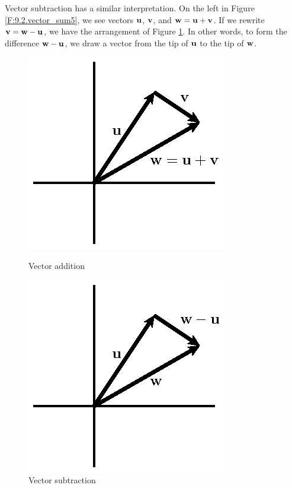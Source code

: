 Vector subtraction has a similar interpretation.  On the left in
Figure \ref{F:9.2.vector_sum5}, we see vectors $\mathbf{u}$, $\mathbf{v}$, and $\mathbf{w} =
\mathbf{u} + \mathbf{v}$.  If we rewrite $\mathbf{v} = \mathbf{w} - \mathbf{u}$, we have the arrangement
of Figure \ref{F:9.2.vector_sum6}.  In other words, to form the
difference $\mathbf{w}-\mathbf{u}$, we draw a vector from the tip of $\mathbf{u}$ to the
tip of $\mathbf{w}$. 

\begin{figure}[ht]
  \begin{center}
    \begin{minipage}{2.5in}
      \begin{center}
        \includegraphics{figures/fig_9_2_addition.eps}
      \end{center}
      \caption{Vector addition}
      \label{F:9.2.vector_sum5}
    \end{minipage}
    \begin{minipage}{2.5in}
      \begin{center}
        \includegraphics{figures/fig_9_2_subtraction.eps}
      \end{center}
      \caption{Vector subtraction}
      \label{F:9.2.vector_sum6}
    \end{minipage}
  \end{center}
\end{figure}

